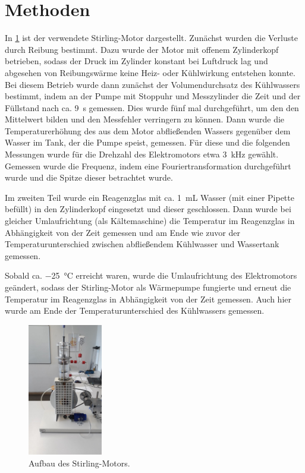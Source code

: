 \documentclass[
	a4paper,
	12pt,
	pagesize,
	ngerman
]{scrartcl}
\begin{document}
	\section{Methoden} \label{sec_Methoden}
	
	In \cref{Aufbau} ist der verwendete Stirling-Motor dargestellt.
	Zunächst wurden die Verluste durch Reibung bestimmt.
	Dazu wurde der Motor mit offenem Zylinderkopf betrieben, sodass der Druck im Zylinder konstant bei Luftdruck lag und abgesehen von Reibungswärme keine Heiz- oder Kühlwirkung entstehen konnte.
	Bei diesem Betrieb wurde dann zunächst der Volumendurchsatz des Kühlwassers bestimmt, indem an der Pumpe mit Stoppuhr und Messzylinder die Zeit und der Füllstand nach ca. \SI{9}{\second} gemessen.
	Dies wurde fünf mal durchgeführt, um den den Mittelwert bilden und den Messfehler verringern zu können.
	Dann wurde die Temperaturerhöhung des aus dem Motor abfließenden Wassers gegenüber dem Wasser im Tank, der die Pumpe speist, gemessen.
	Für diese und die folgenden Messungen wurde für die Drehzahl des Elektromotors etwa \SI{3}{\kilo \hertz} gewählt.
	Gemessen wurde die Frequenz, indem eine Fouriertransformation durchgeführt wurde und die Spitze dieser betrachtet wurde.
	
	Im zweiten Teil wurde ein Reagenzglas mit ca. \SI{1}{\milli \liter} Wasser (mit einer Pipette befüllt) in den Zylinderkopf eingesetzt und dieser geschlossen.
	Dann wurde bei gleicher Umlaufrichtung (als Kältemaschine) die Temperatur im Reagenzglas in Abhängigkeit von der Zeit gemessen und am Ende wie zuvor der Temperaturunterschied zwischen abfließendem Kühlwasser und Wassertank gemessen.
	
	Sobald ca. \SI{-25}{\degreeCelsius} erreicht waren, wurde die Umlaufrichtung des Elektromotors geändert, sodass der Stirling-Motor als Wärmepumpe fungierte und erneut die Temperatur im Reagenzglas in Abhängigkeit von der Zeit gemessen.
	Auch hier wurde am Ende der Temperaturunterschied des Kühlwassers gemessen.
	
	\begin{figure}[H]
		\includegraphics[width=0.29\textwidth]{Aufbau}
		\centering
		\caption{Aufbau des Stirling-Motors.}
		\label{Aufbau}
		\centering
	\end{figure} 
\end{document}
